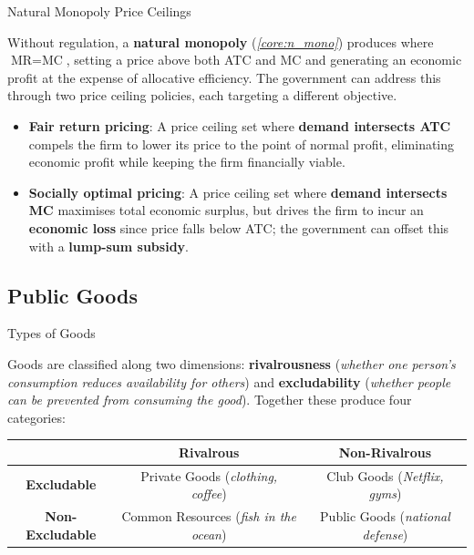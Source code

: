\documentclass[10pt]{article}
\begin{document}
    \begin{core}{Natural Monopoly Price Ceilings}

      Without regulation, a \textbf{natural monopoly} (\textit{\autoref{core:n_mono}}) produces where $\text{MR} = \text{MC}$, setting a price above both ATC and MC and generating an economic profit at the expense of allocative efficiency. The government can address this through two price ceiling policies, each targeting a different objective.

      \begin{itemize}

        \item \textbf{Fair return pricing}: A price ceiling set where \textbf{demand intersects ATC} compels the firm to lower its price to the point of normal profit, eliminating economic profit while keeping the firm financially viable.


        \item \textbf{Socially optimal pricing}: A price ceiling set where \textbf{demand intersects MC} maximises total economic surplus, but drives the firm to incur an \textbf{economic loss} since price falls below ATC; the government can offset this with a \textbf{lump-sum subsidy}.


      \end{itemize}

    \end{core}

  \subsection{Public Goods}
    \label{sec:pgoods}

    \begin{core}{Types of Goods}

      Goods are classified along two dimensions: \textbf{rivalrousness} (\textit{whether one person's consumption reduces availability for others}) and \textbf{excludability} (\textit{whether people can be prevented from consuming the good}). Together these produce four categories:

      \begin{center}
        \begin{tabular}{ccc}
          \hline
          \hline
          & \textbf{Rivalrous} & \textbf{Non-Rivalrous} \\
          \hline
          \textbf{Excludable} & Private Goods (\textit{clothing, coffee}) & Club Goods (\textit{Netflix, gyms}) \\
          \textbf{Non-Excludable} & Common Resources (\textit{fish in the ocean}) & Public Goods (\textit{national defense}) \\
          \hline
        \end{tabular}
      \end{center}

    \end{core}
\end{document}
